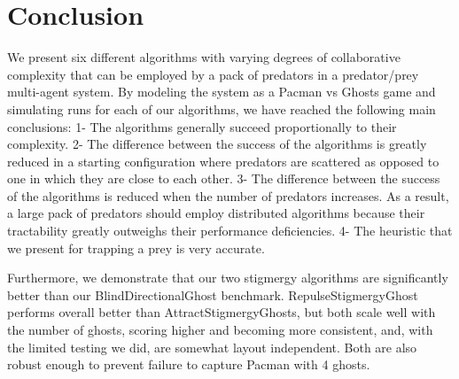 \documentclass[11pt]{article}
\begin{document}
\begin{figure}[H]
\end{figure}
\pagebreak

\section{Conclusion}
We present six different algorithms with varying degrees of collaborative complexity that can be employed by a pack of predators in a predator/prey multi-agent system. By modeling the system as a Pacman vs Ghosts game and simulating runs for each of our algorithms, we have reached the following main conclusions: 1- The algorithms generally succeed proportionally to their complexity. 2- The difference between the success of the algorithms is greatly reduced in a starting configuration where predators are scattered as opposed to one in which they are close to each other. 3- The difference between the success of the algorithms is reduced when the number of predators increases. As a result, a large pack of predators should employ distributed algorithms because their tractability greatly outweighs their performance deficiencies. 4- The heuristic that we present for trapping a prey is very accurate.

Furthermore, we demonstrate that our two stigmergy algorithms are significantly better than our BlindDirectionalGhost benchmark.  RepulseStigmergyGhost performs overall better than AttractStigmergyGhosts, but both scale well with the number of ghosts, scoring higher and becoming more consistent, and, with the limited testing we did, are somewhat layout independent.  Both are also robust enough to prevent failure to capture Pacman with 4 ghosts.
\end{document}
